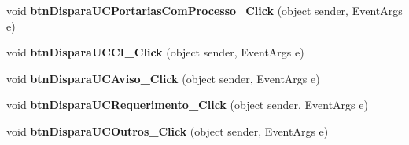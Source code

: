\begin{DoxyCompactItemize}
\item 
\hypertarget{class_sistema_r_h_1_1_cadastro_docs_a7577246458214684679196fe97de5d55}{
void {\bfseries btnDisparaUCPortariasComProcesso\_\-Click} (object sender, EventArgs e)}
\label{class_sistema_r_h_1_1_cadastro_docs_a7577246458214684679196fe97de5d55}

\item 
\hypertarget{class_sistema_r_h_1_1_cadastro_docs_ab9064f2c6523bb477708406c095b8422}{
void {\bfseries btnDisparaUCCI\_\-Click} (object sender, EventArgs e)}
\label{class_sistema_r_h_1_1_cadastro_docs_ab9064f2c6523bb477708406c095b8422}

\item 
\hypertarget{class_sistema_r_h_1_1_cadastro_docs_aa439537fe6d90ce46963a66d9f03d01d}{
void {\bfseries btnDisparaUCAviso\_\-Click} (object sender, EventArgs e)}
\label{class_sistema_r_h_1_1_cadastro_docs_aa439537fe6d90ce46963a66d9f03d01d}

\item 
\hypertarget{class_sistema_r_h_1_1_cadastro_docs_a6f1b3febdd7235eb60da8973064fee73}{
void {\bfseries btnDisparaUCRequerimento\_\-Click} (object sender, EventArgs e)}
\label{class_sistema_r_h_1_1_cadastro_docs_a6f1b3febdd7235eb60da8973064fee73}

\item 
\hypertarget{class_sistema_r_h_1_1_cadastro_docs_a6b3cb00de5b211e796ce5fd47b9c341e}{
void {\bfseries btnDisparaUCOutros\_\-Click} (object sender, EventArgs e)}
\label{class_sistema_r_h_1_1_cadastro_docs_a6b3cb00de5b211e796ce5fd47b9c341e}


\end{DoxyCompactItemize}
